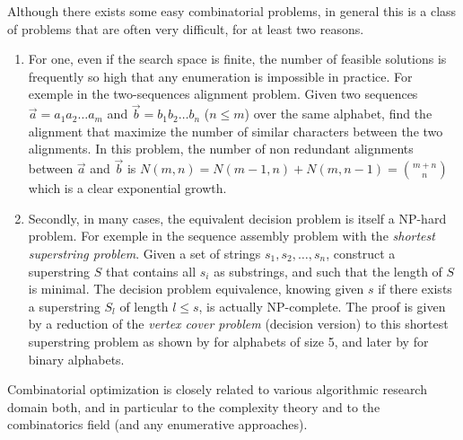 	Although there exists some easy combinatorial problems, in general this is a class of problems that are often very difficult, for at least two reasons.
	\begin{enumerate}
		\item For one, even if the search space is finite, the number of feasible solutions is frequently so high that any enumeration is impossible in practice.
			For exemple in the two-sequences alignment problem.
			Given two sequences $\vec{a}=a_1a_2\ldots{}a_m$ and $\vec{b}=b_1b_2\ldots{}b_n$ ($n \leq m$) over the same alphabet, find the alignment that maximize the number of similar characters between the two alignments.
			In this problem, the number of non redundant alignments between $\vec{a}$ and $\vec{b}$ is $N(m,n)=N(m-1,n)+N(m,n-1)=\binom{m+n}{n}$ which is a clear exponential growth.

		\item Secondly, in many cases, the equivalent decision problem is itself a NP-hard problem.
			For exemple in the sequence assembly problem with the \emph{shortest superstring problem}.
			Given a set of strings $s_1, s_2, \ldots, s_n$, construct a superstring $S$ that contains all $s_i$ as substrings, and such that the length of $S$ is minimal.
			The decision problem equivalence, knowing given $s$ if there exists a superstring $S_l$ of length $l \leq s$, is actually NP-complete.
			The proof is given by a reduction of the \emph{vertex cover problem} (decision version) to this shortest superstring problem as shown by \textcite{maier1978complexity} for alphabets of size 5, and later by \textcite{raiha1981shortest} for binary alphabets.

	\end{enumerate}

	Combinatorial optimization is closely related to various algorithmic research domain both, and in particular to the complexity theory and to the combinatorics field (and any enumerative approaches).

